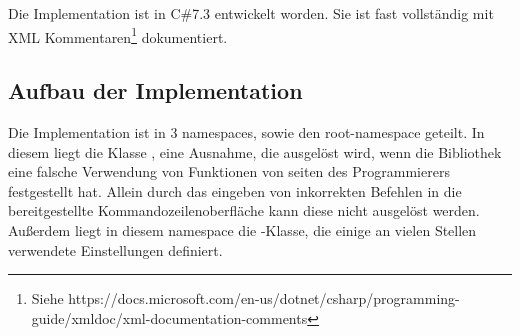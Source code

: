 Die Implementation ist in C\#7.3 entwickelt worden.
Sie ist fast vollständig mit XML Kommentaren\footnote{Siehe https://docs.microsoft.com/en-us/dotnet/csharp/programming-guide/xmldoc/xml-documentation-comments} dokumentiert.
\subsection{Aufbau der Implementation}\label{subsec:Architecture}
Die Implementation ist in 3 namespaces, sowie den root-namespace geteilt.
In diesem liegt die Klasse , eine Ausnahme, die ausgelöst wird, wenn die Bibliothek eine falsche Verwendung von Funktionen von seiten des Programmierers festgestellt hat.
Allein durch das eingeben von inkorrekten Befehlen in die bereitgestellte Kommandozeilenoberfläche kann diese nicht ausgelöst werden.
Au\ss erdem liegt in diesem namespace die -Klasse, die einige an vielen Stellen verwendete Einstellungen definiert.
